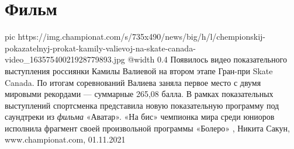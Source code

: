  
 
 
 
 
\chapter{Фильм}
\label{sec:slova.film}

\ifcmt
  pic https://img.championat.com/s/735x490/news/big/h/l/chempionskij-pokazatelnyj-prokat-kamily-valievoj-na-skate-canada-video_16357540021928779893.jpg
  @width 0.4
\fi
Появилось видео показательного выступления россиянки Камилы Валиевой на втором
этапе Гран-при Skate Canada. По итогам соревнований Валиева заняла первое место
с двумя мировыми рекордами — суммарные 265,08 балла.  В рамках показательных
выступлений спортсменка представила новую показательную программу под
саундтреки из \emph{фильма} «Аватар». «На бис» чемпионка мира среди юниоров
исполнила фрагмент своей произвольной программы «Болеро»
, 
Никита Сакун, www.championat.com, 01.11.2021
